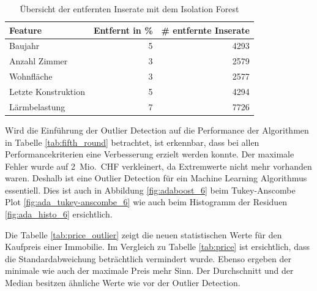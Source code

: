 \begin{table}[ht]
\centering
{}
\begin{tabular}{@{}lrr@{}}
\toprule
Feature & Entfernt in \% & \# entfernte Inserate\\
\midrule
Baujahr & 5 & 4293\\
Anzahl Zimmer & 3 & 2579\\
Wohnfläche & 3 & 2577\\
Letzte Konstruktion & 5 & 4294\\
Lärmbelastung & 7 & 7726\\
\bottomrule
\end{tabular}
\caption{Übersicht der entfernten Inserate mit dem Isolation Forest}
\label{tab:iso_forest}
\end{table}
%
\begin{table}[ht]
\centering
{}
\caption{Ergebnisse mit Einbezug einer Outlier Detection}
\label{tab:fifth_round}
\end{table}

Wird die Einführung der Outlier Detection auf die Performance der Algorithmen in Tabelle \ref{tab:fifth_round} betrachtet, ist erkennbar, dass bei allen Performancekriterien eine Verbesserung erzielt werden konnte. Der maximale Fehler wurde auf 2~Mio.~CHF verkleinert, da Extremwerte nicht mehr vorhanden waren. Deshalb ist eine Outlier Detection für ein Machine Learning Algorithmus essentiell. Dies ist auch in Abbildung \ref{fig:adaboost_6} beim Tukey-Anscombe Plot \ref{fig:ada_tukey-anscombe_6} wie auch beim Histogramm der Residuen \ref{fig:ada_histo_6} ersichtlich.

Die Tabelle \ref{tab:price_outlier} zeigt die neuen statistischen Werte für den Kaufpreis einer Immobilie. Im Vergleich zu Tabelle \ref{tab:price} ist ersichtlich, dass die Standardabweichung beträchtlich vermindert wurde. Ebenso ergeben der minimale wie auch der maximale Preis mehr Sinn. Der Durchschnitt und der Median besitzen ähnliche Werte wie vor der Outlier Detection.

